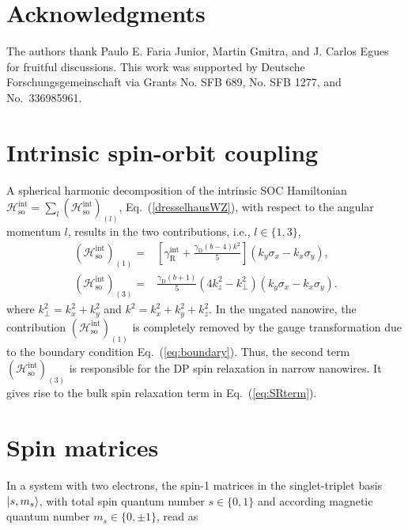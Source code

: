 \documentclass[superscriptaddress,noshowpacs,noshowkeys, twocolumn, floatfix,aps, prb,reprint]{revtex4-1}
\begin{document}
\section{Acknowledgments}

The authors thank Paulo E. Faria Junior, Martin Gmitra, and J. Carlos Egues for fruitful discussions.
This work was supported by Deutsche Forschungsgemeinschaft via Grants No. SFB 689, No. SFB 1277, and No.~336985961. 



\appendix


\section{Intrinsic spin-orbit coupling}\label{app:SOC}
%
A spherical harmonic decomposition of the  intrinsic SOC Hamiltonian $\mathcal{H}_\text{so}^\text{int}=\sum_l(\mathcal{H}_\text{so}^\text{int})_{(l)}$, Eq.~(\ref{dresselhausWZ}), with respect to the angular momentum $l$, results in the two contributions, i.e., $l\in\{1,3\}$,
%
\begin{align}
(\mathcal{H}_\text{so}^\text{int})_{(1)}=&{}\left[\gamma_\text{R}^\text{int}+\frac{\gamma_\text{D}(b-4) k^2}{5}\right](k_y\sigma_x-k_x\sigma_y),\label{1SH}\\
(\mathcal{H}_\text{so}^\text{int})_{(3)}=&{}\frac{\gamma_\text{D}(b+1)}{5}\left(4k_z^2-k_\perp^2\right)(k_y\sigma_x-k_x\sigma_y).\label{3SH}
\end{align}
%
where $k_\perp^2=k_x^2+k_y^2$ and $k^2=k_x^2+k_y^2+k_z^2$.
In the ungated nanowire, the contribution $(\mathcal{H}_\text{so}^\text{int})_{(1)}$ is completely removed by the gauge transformation due to the boundary condition Eq.~(\ref{eq:boundary}).
Thus, the second term $(\mathcal{H}_\text{so}^\text{int})_{(3)}$ is  responsible for the DP spin relaxation in narrow nanowires.
It gives rise to the bulk spin relaxation term in Eq.~(\ref{eq:SRterm}).



\section{Spin matrices}\label{app:spin}


In a system with two electrons, the spin-1 matrices in the singlet-triplet basis $\ket{s,m_s}$, with total spin quantum number $s \in\{0,1\}$ and according magnetic quantum number $m_s \in\{0,\pm1\}$, read as
\end{document}
